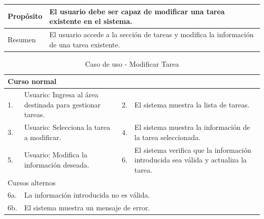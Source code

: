 \begin{table}[H]
    \centering
    \begin{tabular}{| m{} | m{} | m{} | m{} |}
        \hline
        Propósito & \multicolumn{3}{m{0.67\textwidth}|}{El usuario debe ser capaz de modificar una tarea existente en el sistema.} \\ 
        \hline
        Resumen & \multicolumn{3}{m{0.67\textwidth}|}{El usuario accede a la sección de tareas y modifica la información de una tarea existente.} \\ 
        \hline
    \end{tabular}
\end{table}

\begin{table}[H]
    \centering
    \begin{tabular}{| m{} | m{} | m{} | m{} |}
        \hline
        \multicolumn{4}{|m{0.9\textwidth}|}{Curso normal} \\ 
        \hline
        1. & Usuario: Ingresa al área destinada para gestionar tareas. 
        & 2. & El sistema muestra la lista de tareas. \\ 
        \hline
        3. & Usuario: Selecciona la tarea a modificar. 
        & 4. & El sistema muestra la información de la tarea seleccionada. \\ 
        \hline
        5. & Usuario: Modifica la información deseada. 
        & 6. & El sistema verifica que la información introducida sea válida y actualiza la tarea. \\  
        \hline
        \multicolumn{4}{|m{0.9\textwidth}|}{Cursos alternos} \\ 
        \hline 
        6a. & \multicolumn{3}{l|}{La información introducida no es válida.} \\ 
        \hline
        6b. & \multicolumn{3}{l|}{El sistema muestra un mensaje de error.} \\ 
        \hline
    \end{tabular}
    \caption{Caso de uso - Modificar Tarea}
\end{table}

\newpage

